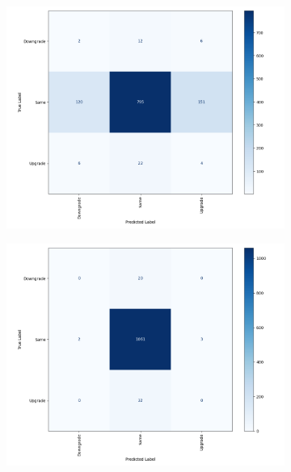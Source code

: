 \documentclass{article}[11pt]
\begin{document}
    \begin{figure}[h!]
        \caption{Most Complex Model - Rating Changes Confusion Matrices}
        \begin{subfigure}[h]{0.4925\textwidth}
            \centering
            \includegraphics[width=0.95\hsize]{../Output/Modelling/Logistic Regression/smote_rating_change_model_3/smote_rating_change_model_3_confusion_matrix_no_title.png}
        \end{subfigure}
        \begin{subfigure}[h]{0.4925\textwidth}
            \centering
            \includegraphics[width=0.95\hsize]{../Output/Modelling/XGBoost/smote_rating_change_model_3/smote_rating_change_model_3_confusion_matrix_no_title.png}
        \end{subfigure}
        \hfill
        \label{fig:change-confusion-matrix}
    \end{figure}
\end{document}
